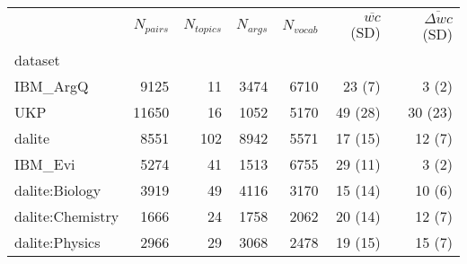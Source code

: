 \begin{tabular}{lrrrrrr}
\toprule
{} &  $N_{pairs}$ &  $N_{topics}$ &  $N_{args}$  &  $N_{vocab}$ & 
$\overline{wc}$ (SD) & 
$\overline{\Delta wc}$ (SD)\\
dataset          &          &           &         &        &              &                   \\
\midrule
IBM\_ArgQ         &     9125 &        11 &    3474 &   6710 &       23 (7) &             3 (2) \\
UKP              &    11650 &        16 &    1052 &   5170 &      49 (28) &           30 (23) \\
dalite           &     8551 &       102 &    8942 &   5571 &      17 (15) &            12 (7) \\
IBM\_Evi          &     5274 &        41 &    1513 &   6755 &      29 (11) &             3 (2) \\
dalite:Biology   &     3919 &        49 &    4116 &   3170 &      15 (14) &            10 (6) \\
dalite:Chemistry &     1666 &        24 &    1758 &   2062 &      20 (14) &            12 (7) \\
dalite:Physics   &     2966 &        29 &    3068 &   2478 &      19 (15) &            15 (7) \\
\bottomrule
\end{tabular}
